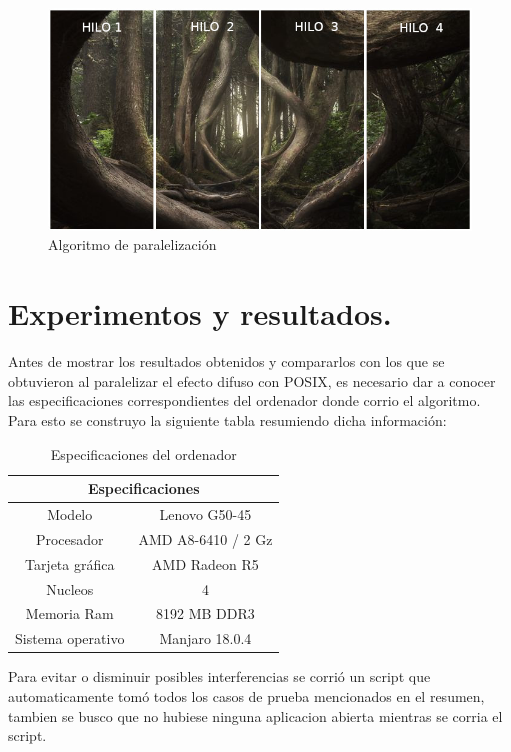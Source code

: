 \documentclass{IEEEtran}
\begin{document}
\begin{figure}[H]
  \includegraphics[width=\linewidth]{modi.jpg}
  \caption{Algoritmo de paralelización}
  \label{paralelizacion}
\end{figure}

\section{Experimentos y resultados.}
Antes de mostrar los resultados obtenidos y compararlos con 
los que se obtuvieron al paralelizar el efecto difuso con POSIX, 
es necesario dar a conocer las especificaciones correspondientes 
del ordenador donde corrio el algoritmo. Para esto se construyo 
la siguiente tabla resumiendo dicha información:

\begin{table}[H]
\centering
    \begin{tabular}{ |c|c| } 
\hline
\multicolumn{2}{|c|}{Especificaciones} \\
\hline
Modelo & Lenovo G50-45\\
 \hline
 Procesador & AMD A8-6410 / 2 Gz \\ 
 \hline
 Tarjeta gráfica & AMD Radeon R5 \\ 
 \hline
 Nucleos & 4\\ 
 \hline
 Memoria Ram & 8192 MB DDR3
 \\ 
 \hline
 Sistema operativo & Manjaro 18.0.4 \\ 
 \hline
\end{tabular}
\caption{Especificaciones del ordenador}
\end{table}

Para evitar o disminuir posibles interferencias se corrió
 un script que automaticamente tomó todos los casos de prueba
 mencionados en el resumen, tambien se busco que no hubiese ninguna 
  aplicacion abierta mientras se corria el script.
\end{document}

